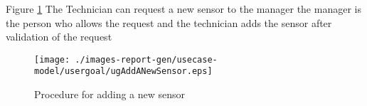 \begin{usecase}


\end{usecase} 


Figure \ref{fig:lu.uni.lassy.excalibur.group01.excalibur-RE-UCD-ugAddANewSensor}
The Technician can request a new sensor to the manager the manager is the
 person who allows the request and the technician adds the sensor after validation of the request

\begin{figure}[htbp]
\begin{center}

\texttt{[image: ./images-report-gen/usecase-model/usergoal/ugAddANewSensor.eps]}
\end{center}
\caption[lu.uni.lassy.excalibur.group01.excalibur Use Case Diagram: ugAddANewSensor]{Procedure for adding a new sensor}
\label{fig:lu.uni.lassy.excalibur.group01.excalibur-RE-UCD-ugAddANewSensor}
\end{figure}
\vspace{0.5cm}
